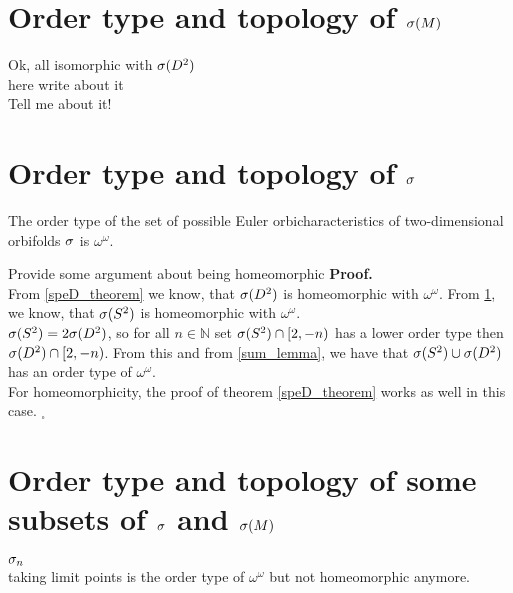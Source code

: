 \section{Order type and topology of ${{\sigma}(M)}$}\label{all_spectra_are_isomorphic}
Ok, all isomorphic with ${{\sigma}(D^2)}$ \\
here write about it \\
Tell me about it!


\section{Order type and topology of ${\sigma}$}
\begin{theorem}
The order type of the set of possible Euler orbicharacteristics of two-dimensional orbifolds 
${\sigma}$ is $\omega^\omega$. 
\end{theorem}
Provide some argument about being homeomorphic 
\noindent\textbf{Proof.} \\
From \ref{speD_theorem} we know, that ${{\sigma}(D^2)}$ is homeomorphic with $\omega^\omega$. From 
\ref{all_spectra_are_isomorphic}, we know, that ${{\sigma}(S^2)}$ is homeomorphic 
with $\omega^\omega$. \\
${{\sigma}(S^2)} = 2{{\sigma}(D^2)}$, so for all $n\in \mathbb{N}$ set ${{\sigma}(S^2)} \cap [2,-n)$ has a lower order type then 
${{\sigma}(D^2)}\cap [2,-n)$. From this and from \ref{sum_lemma}, we have that ${{\sigma}(S^2)} \cup {{\sigma}(D^2)}$ 
has an order type of $\omega^\omega$. \\
For homeomorphicity, the proof of theorem \ref{speD_theorem} works as well in this case.
$_\square$ \\[4pt]

\section{Order type and topology of some subsets of ${\sigma}$ and ${\sigma}(M)$} 
${\sigma}_n$ \\
taking limit points is the order type of $\omega^\omega$ but not homeomorphic anymore. 






